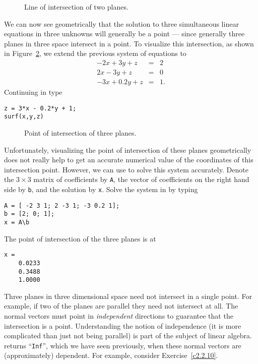 \documentclass{ximera}
\begin{document}
\begin{figure}[htb]
              \centerline{%
              }
              \caption{Line of intersection of two planes.}
              \label{F:p2int}
\end{figure}

We can now see geometrically that the solution to three
simultaneous linear equations in three unknowns will generally
be a point --- since generally three planes in three space
intersect in a point.  To visualize this intersection, as shown in
Figure~\ref{F:p3int}, we extend the previous system of equations to
\begin{eqnarray*}
-2x +   3y + z & = & 2 \\
 2x -   3y + z & = & 0\\
-3x + 0.2y + z & = & 1.
\end{eqnarray*}
Continuing in \Matlab type
\begin{verbatim}
z = 3*x - 0.2*y + 1;
surf(x,y,z)
\end{verbatim}

\begin{figure}[htb]
              \centerline{%
              }
              \caption{Point of intersection of three planes.}
              \label{F:p3int}
\end{figure}

Unfortunately, visualizing the point of intersection of these
planes geometrically does not really help to get an accurate
numerical value of the coordinates of this intersection point.  
However, we can use \Matlab to solve this system accurately.
Denote the $3\times 3$ matrix of coefficients by {\tt A}, the 
vector of coefficients on the right hand side by {\tt b}, and 
the solution by {\tt x}.  Solve the system in \Matlab by typing
\begin{verbatim}
A = [ -2 3 1; 2 -3 1; -3 0.2 1];
b = [2; 0; 1];
x = A\b
\end{verbatim}
The point of intersection of the three planes is at
\begin{verbatim}
x =
    0.0233
    0.3488
    1.0000
\end{verbatim}

Three planes in three dimensional space need not intersect in a
single point.  For example, if two of the planes are parallel
they need not intersect at all.  The normal vectors must point
in {\em independent\/} directions to
guarantee that the intersection is a point.  Understanding the
notion of independence (it is more complicated than just not
being parallel) is part of the subject of linear algebra.
\Matlab returns ``{\tt Inf}'', which we have seen previously,
when these normal vectors are (approximately) dependent. For
example, consider Exercise~\ref{c2.2.10}.
\end{document}
